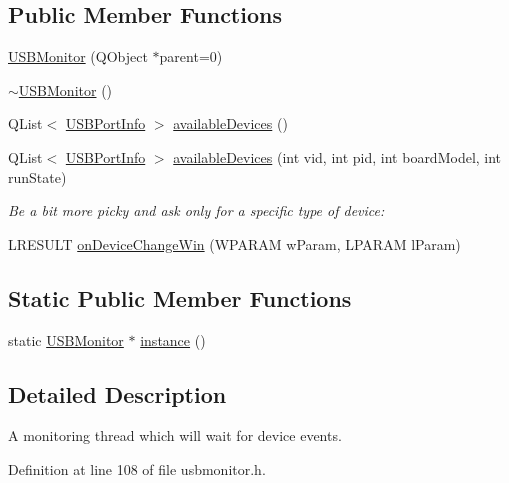 \subsection*{\-Public \-Member \-Functions}
\begin{DoxyCompactItemize}
\item 
\hyperlink{group___raw_h_i_d_plugin_ga1de6bdbd3deee4991e3b910e6d274121}{\-U\-S\-B\-Monitor} (\-Q\-Object $\ast$parent=0)
\item 
\hyperlink{group___raw_h_i_d_plugin_ga0a472129bd25e3c7972ce78ca52ed19d}{$\sim$\-U\-S\-B\-Monitor} ()
\item 
\-Q\-List$<$ \hyperlink{struct_u_s_b_port_info}{\-U\-S\-B\-Port\-Info} $>$ \hyperlink{group___raw_h_i_d_plugin_gaf7da3cc1fc2b9085f5647f0d3822ade1}{available\-Devices} ()
\item 
\-Q\-List$<$ \hyperlink{struct_u_s_b_port_info}{\-U\-S\-B\-Port\-Info} $>$ \hyperlink{group___raw_h_i_d_plugin_ga8b0ce433f3d1f5907b290b1f4185984d}{available\-Devices} (int vid, int pid, int board\-Model, int run\-State)
\begin{DoxyCompactList}\small\item\em \-Be a bit more picky and ask only for a specific type of device\-: \end{DoxyCompactList}\item 
\-L\-R\-E\-S\-U\-L\-T \hyperlink{group___raw_h_i_d_plugin_ga108b55e821dbc91874e52cdb7cb71150}{on\-Device\-Change\-Win} (\-W\-P\-A\-R\-A\-M w\-Param, \-L\-P\-A\-R\-A\-M l\-Param)
\end{DoxyCompactItemize}
\subsection*{\-Static \-Public \-Member \-Functions}
\begin{DoxyCompactItemize}
\item 
static \hyperlink{class_u_s_b_monitor}{\-U\-S\-B\-Monitor} $\ast$ \hyperlink{group___raw_h_i_d_plugin_gabcb44085db71f0bd0a1513d25a572b33}{instance} ()
\end{DoxyCompactItemize}


\subsection{\-Detailed \-Description}
\-A monitoring thread which will wait for device events. 

\-Definition at line 108 of file usbmonitor.\-h.




